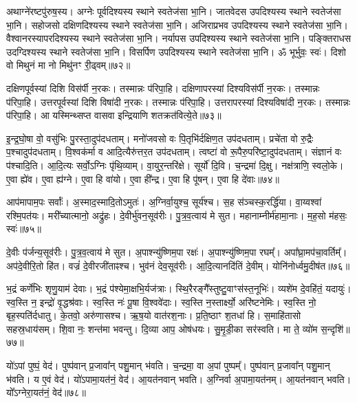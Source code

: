 अथाग्ने॑रष्टपु॑रुष॒स्य। 
अग्नेः पूर्वदिश्यस्य स्थाने स्वतेज॑सा भा॒नि। 
जातवेदस उपदिश्यस्य स्थाने स्वतेज॑सा भा॒नि। 
सहोजसो दक्षिणदिश्यस्य स्थाने स्वतेज॑सा भा॒नि। 
अजिराप्रभव उपदिश्यस्य स्थाने स्वतेज॑सा भा॒नि। 
वैश्वानरस्यापरदिश्यस्य स्थाने स्वतेज॑सा भा॒नि। 
नर्यापस उपदिश्यस्य स्थाने स्वतेज॑सा भा॒नि। 
पङ्क्तिराधस उदग्दिश्यस्य स्थाने स्वतेज॑सा भा॒नि। 
विसर्पिण उपदिश्यस्य स्थाने स्वतेज॑सा भा॒नि। 
ॐ भूर्भुवः॒ स्वः॑। दिशो वो मिथुनं मा नो मिथु॑नꣳ री॒ढ्वम्॥७२॥\ip\anuvakamend


दक्षिणपूर्वस्यां दिशि विस॑र्पी न॒रकः। तस्मान्नः प॑रिपा॒हि। 
दक्षिणापरस्यां दिश्यविस॑र्पी न॒रकः। तस्मान्नः प॑रिपा॒हि। 
उत्तरपूर्वस्यां दिशि विषा॑दी न॒रकः। तस्मान्नः प॑रिपा॒हि। 
उत्तरापरस्यां दिश्यविषा॑दी न॒रकः। तस्मान्नः प॑रिपा॒हि। 
आ यस्मिन्थ्सप्त वासवा इन्द्रियाणि शतक्रत॑वित्ये॒ते॥७३॥\ip\anuvakamend


इ॒न्द्र॒घो॒षा वो॒ वसु॑भिः पु॒रस्ता॒दुप॑दधताम्। 
मनो॑जवसो वः पि॒तृभि॑र्दक्षिण॒त उप॑दधताम्। 
प्रचे॑ता वो रु॒द्रैः प॒श्चादुप॑दधताम्। 
वि॒श्वक॑र्मा व आदि॒त्यैरु॑त्तर॒त उप॑दधताम्। 
त्वष्टा॑ वो रू॒पैरु॒परि॑ष्टा॒दुप॑\-दधताम्। 
संज्ञानं वः प॑श्चादि॒ति। आ॒दि॒त्यः सर्वो॒\-ऽग्निः पृ॑थि॒व्याम्। 
वा॒युर॒न्तरि॑क्षे। सूर्यो॑ दि॒वि। च॒न्द्रमा॑ दि॒क्षु। 
नक्ष॑त्राणि॒ स्वलो॒के। ए॒वा ह्ये॑व। ए॒वा ह्य॑ग्ने। 
ए॒वा हि वा॑यो। ए॒वा ही᳚न्द्र। ए॒वा हि पू॑षन्। ए॒वा हि दे॑वाः॥७४॥\ip\anuvakamend


आप॑मापाम॒पः सर्वाः᳚। अ॒स्माद॒स्मादि॒तो\-ऽमुतः॑।
अ॒ग्निर्वा॒युश्च॒ सूर्य॑श्च। स॒ह स॑ञ्चस्क॒रर्द्धि॑या। 
वा॒य्वश्वा॑ रश्मि॒पत॑यः। मरी᳚च्यात्मानो॒ अद्रु॑हः। 
दे॒वीर्भु॑वन॒सूव॑रीः। पु॒त्र॒व॒त्वाय॑ मे सुत। 
महानाम्नीर्म॑हा\-मा॒नाः। म॒ह॒सो म॑हसः॒ स्वः॑॥७५॥\ip


दे॒वीः प॑र्जन्य॒सूव॑रीः। पु॒त्र॒व॒त्वाय॑ मे सुत। 
अ॒पा\-श्न्यु॑ष्णिम॒पा रक्षः॑। अ॒पा\-श्न्यु॑ष्णि\-म॒पा रघम्᳚। 
अपा᳚घ्रा॒मप॑चा॒वर्तिम्᳚। अप॑दे॒वीरि॒तो हि॑त। 
वज्रं॑ दे॒वी\-रजी॑ताꣴश्च। भुव॑नं देव॒सूव॑रीः। 
आ॒दि॒त्यानदि॑तिं दे॒वीम्। योनि॑नोर्ध्वमु॒दीष॑त॥७६॥\ip


भ॒द्रं कर्णे॑भिः शृणु॒याम॑ देवाः। भ॒द्रं प॑श्येमा॒क्षभि॒र्यज॑त्राः। 
स्थि॒रैरङ्गै᳚स्तुष्टु॒\-वाꣳस॑स्त॒नूभिः॑। व्यशे॑म दे॒वहि॑तं॒ यदायुः॑। 
स्व॒स्ति न॒ इन्द्रो॑ वृ॒द्धश्र॑वाः। स्व॒स्ति नः॑ पू॒षा वि॒श्ववे॑दाः। 
स्व॒स्ति न॒स्तार्क्ष्यो॒ अरि॑ष्टनेमिः। स्व॒स्ति नो॒ बृह॒स्पति॑र्दधातु। 
के॒तवो॒ अरु॑णासश्च। ऋ॒ष॒यो वात॑रश॒नाः। 
प्र॒ति॒ष्ठाꣳ श॒तधा॑ हि। स॒माहि॑तासो सहस्र॒धाय॑सम्। 
शि॒वा नः॒ शन्त॑मा भवन्तु। दि॒व्या आप॒ ओष॑धयः। 
सु॒मृ॒डी॒का सर॑स्वति। मा ते॒ व्यो॑म स॒न्दृशि॑॥७७॥\ip\anuvakamend


यो॑\-ऽपां पुष्पं॒ वेद॑। पुष्प॑वान्‌ प्र॒जावा᳚न् पशु॒मान् भ॑वति। 
च॒न्द्रमा॒ वा अ॒पां पुष्पम्᳚। पुष्प॑वान् प्र॒जावा᳚न् पशु॒मान्‌ भ॑वति। 
य ए॒वं वेद॑। यो॑\-ऽपामा॒यत॑नं॒ वेद॑। 
आ॒यत॑नवान्‌ भवति। अ॒ग्निर्वा अ॒पामा॒यत॑नम्। 
आ॒यत॑नवान्‌ भवति। यो᳚\-ऽग्नेरा॒यत॑नं॒ वेद॑॥७८॥\ip


